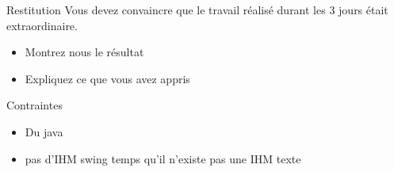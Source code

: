 \documentclass{beamer}
\begin{document}
\begin{frame}{Restitution}
  Vous devez convaincre que le travail réalisé durant les 3 jours était extraordinaire.
  \begin{itemize}
    \item Montrez nous le résultat
    \item Expliquez ce que vous avez appris
  \end{itemize}
\end{frame}

\begin{frame}{Contraintes}
  \begin{itemize}
    \item Du java
    \item pas d'IHM swing temps qu'il n'existe pas une IHM texte
  \end{itemize}
\end{frame}
\end{document}
